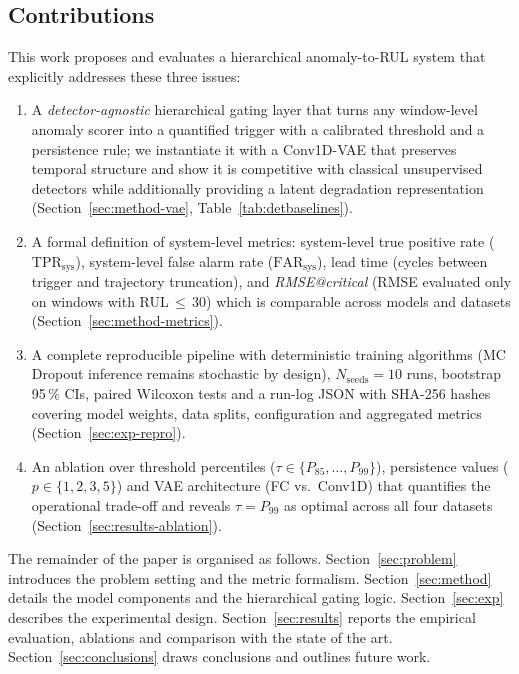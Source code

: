 \documentclass[5p,times,authoryear]{elsarticle}
\begin{document}
\subsection{Contributions}\label{sec:contribs}

This work proposes and evaluates a hierarchical anomaly-to-RUL system that explicitly addresses these three issues:
{\sloppy
\begin{enumerate}
    \item A \emph{detector-agnostic} hierarchical gating layer that turns any window-level anomaly scorer into a quantified trigger with a calibrated threshold and a persistence rule; we instantiate it with a Conv1D-VAE that preserves temporal structure and show it is competitive with classical unsupervised detectors while additionally providing a latent degradation representation (Section~\ref{sec:method-vae}, Table~\ref{tab:detbaselines}).
    \item A formal definition of system-level metrics: system-level true positive rate ($\mathrm{TPR}_{\mathrm{sys}}$), system-level false alarm rate ($\mathrm{FAR}_{\mathrm{sys}}$), lead time (cycles between trigger and trajectory truncation), and \emph{RMSE@critical} (RMSE evaluated only on windows with RUL\,$\le$\,30) which is comparable across models and datasets (Section~\ref{sec:method-metrics}).
    \item A complete reproducible pipeline with deterministic training algorithms (MC Dropout inference remains stochastic by design), $N_{\mathrm{seeds}}{=}10$ runs, bootstrap 95\,\% CIs, paired Wilcoxon tests and a run-log JSON with SHA-256 hashes covering model weights, data splits, configuration and aggregated metrics (Section~\ref{sec:exp-repro}).
    \item An ablation over threshold percentiles ($\tau\in\{P_{85},\ldots,P_{99}\}$), persistence values ($p\in\{1,2,3,5\}$) and VAE architecture (FC vs.\ Conv1D) that quantifies the operational trade-off and reveals $\tau{=}P_{99}$ as optimal across all four datasets (Section~\ref{sec:results-ablation}).
\end{enumerate}
}

The remainder of the paper is organised as follows. Section~\ref{sec:problem} introduces the problem setting and the metric formalism. Section~\ref{sec:method} details the model components and the hierarchical gating logic. Section~\ref{sec:exp} describes the experimental design. Section~\ref{sec:results} reports the empirical evaluation, ablations and comparison with the state of the art. Section~\ref{sec:conclusions} draws conclusions and outlines future work.
\end{document}
